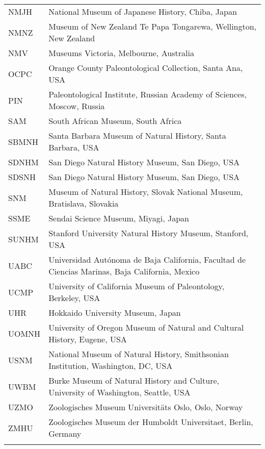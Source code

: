 \begin{longtable}{lp{}}
NMJH &
National Museum of Japanese History, Chiba, Japan\\
NMNZ &
Museum of New Zealand Te Papa Tongarewa, Wellington, New Zealand\\
NMV &
Museums Victoria, Melbourne, Australia\\
OCPC &
Orange County Paleontological Collection, Santa Ana, USA\\
PIN &
Paleontological Institute, Russian Academy of Sciences, Moscow, Russia\\
SAM &
South African Museum, South Africa\\
SBMNH &
Santa Barbara Museum of Natural History, Santa Barbara, USA\\
SDNHM &
San Diego Natural History Museum, San Diego, USA\\
SDSNH &
San Diego Natural History Museum, San Diego, USA\\
SNM &
Museum of Natural History, Slovak National Museum, Bratislava, Slovakia\\
SSME &
Sendai Science Museum, Miyagi, Japan\\
SUNHM &
Stanford University Natural History Museum, Stanford, USA\\
UABC &
Universidad Aut\'{o}noma de Baja California, Facultad de Ciencias Marinas, Baja California, Mexico\\
UCMP &
University of California Museum of Paleontology, Berkeley, USA\\
UHR &
Hokkaido University Museum, Japan\\
UOMNH &
University of Oregon Museum of Natural and Cultural History, Eugene, USA\\
USNM &
National Museum of Natural History, Smithsonian Institution, Washington, DC, USA\\
UWBM &
Burke Museum of Natural History and Culture, University of Washington, Seattle, USA\\
UZMO &
Zoologisches Museum Universit\"{a}ts Oslo, Oslo, Norway\\
ZMHU &
Zoologisches Museum der Humboldt Universitaet, Berlin, Germany\\
\hline

\label{table-institutions}
\end{longtable}
